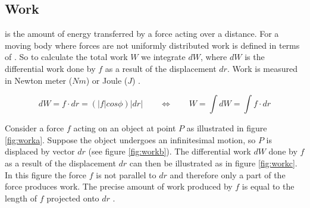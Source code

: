 \subsection{Work}
\label{sec:work}
 is the amount of energy transferred by a force acting over a
distance. For a moving body where forces are not uniformly distributed
work is defined in terms of . So to calculate
the total work $W$ we
integrate $dW$, where $dW$ is the differential work done by $f$ as a
result of the displacement $dr$. Work is measured in Newton meter
($Nm$) or Joule ($J$) .

\begin{equation}
  dW = f \cdot dr = (|f|cos \phi)|dr|
  \qquad \Leftrightarrow \qquad
  W = \int dW = \int f \cdot dr
\end{equation}

Consider a force $f$ acting on an object at point $P$ as illustrated
in figure \vref{fig:worka}. Suppose the object undergoes an infinitesimal
motion, so $P$ is displaced by vector $dr$ (see figure
\vref{fig:workb}). The differential work $dW$ done by $f$ as a result
of the displacement $dr$ can then be illustrated as in figure
\vref{fig:workc}. In this figure the force $f$ is not parallel to $dr$
and therefore only a part of the force produces work. The precise
amount of work produced by $f$ is equal to the length of $f$ projected
onto $dr$ .

  
